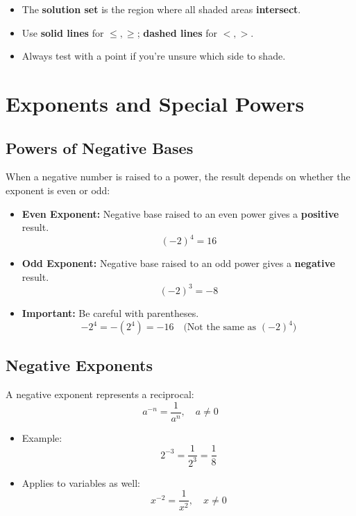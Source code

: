\documentclass[11pt]{article}
\begin{document}
\begin{tcolorbox}[colback=green!5!white, colframe=green!80!black, title=Graphing Systems of Inequalities]
\begin{itemize}
  \item The \textbf{solution set} is the region where all shaded areas \textbf{intersect}.
  \item Use \textbf{solid lines} for \( \leq, \geq \); \textbf{dashed lines} for \( <, > \).
  \item Always test with a point if you're unsure which side to shade.
\end{itemize}
\end{tcolorbox}
\section{Exponents and Special Powers}

\subsection*{Powers of Negative Bases}

When a negative number is raised to a power, the result depends on whether the exponent is even or odd:

\begin{itemize}
  \item \textbf{Even Exponent:} Negative base raised to an even power gives a \textbf{positive} result.
    \[
    (-2)^4 = 16
    \]
  \item \textbf{Odd Exponent:} Negative base raised to an odd power gives a \textbf{negative} result.
    \[
    (-2)^3 = -8
    \]
  \item \textbf{Important:} Be careful with parentheses.
    \[
    -2^4 = -(2^4) = -16 \quad \text{(Not the same as } (-2)^4 \text{)}
    \]
\end{itemize}

\subsection*{Negative Exponents}

A negative exponent represents a reciprocal:
\[
a^{-n} = \frac{1}{a^n}, \quad a \neq 0
\]
\begin{itemize}
  \item Example:
    \[
    2^{-3} = \frac{1}{2^3} = \frac{1}{8}
    \]
  \item Applies to variables as well:
    \[
    x^{-2} = \frac{1}{x^2}, \quad x \neq 0
    \]
\end{itemize}
\end{document}
